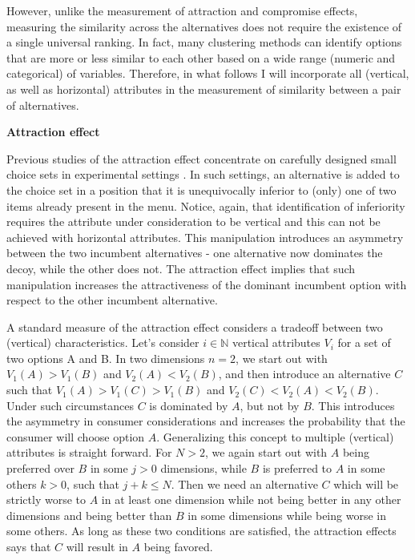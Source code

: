 \documentclass[a4paper,12pt]{article}
\begin{document}
However, unlike the measurement of attraction and compromise effects, measuring the similarity across the alternatives does not require the existence of a single universal ranking. In fact, many clustering methods can identify options that are more or less similar to each other based on a wide range (numeric and categorical) of variables. Therefore, in what follows I will incorporate all (vertical, as well as horizontal) attributes in the measurement of similarity between a pair of alternatives.

\textbf{Attraction effect}

Previous studies of the attraction effect concentrate on carefully designed small choice sets in experimental settings \citep{huberEtAl82, huberPuto83}. In such settings, an alternative is added to the choice set in a position that it is unequivocally inferior to (only) one of two items already present in the menu. Notice, again, that identification of inferiority requires the attribute under consideration to be vertical and this can not be achieved with horizontal attributes. This manipulation introduces an asymmetry between the two incumbent alternatives - one alternative now dominates the decoy, while the other does not. The attraction effect implies that such manipulation increases the attractiveness of the dominant incumbent option with respect to the other incumbent alternative. 

A standard measure of the attraction effect considers a tradeoff between two (vertical) characteristics. Let's consider $i \in \mathbb{N}$ vertical attributes  $V_i$ for a set of two options A and B. In two dimensions $n = 2$, we start out with $V_1(A) > V_1(B)$ and $V_2(A) < V_2(B)$, and then introduce an alternative $C$ such that $V_1(A) > V_1(C) > V_1(B)$ and $V_2(C) < V_2(A) < V_2(B)$. Under such circumstances $C$ is dominated by $A$, but not by $B$. This introduces the asymmetry in consumer considerations and increases the probability that the consumer will choose option $A$. Generalizing this concept to multiple (vertical) attributes is straight forward. For $N > 2$, we again start out with $A$ being preferred over $B$ in some $j > 0$ dimensions, while $B$ is preferred to $A$ in some others $k > 0$, such that $j+k \le N$. Then we need an alternative $C$ which will be strictly worse to $A$ in at least one dimension while not being better in any other dimensions and being better than $B$ in some dimensions while being worse in some others. As long as these two conditions are satisfied, the attraction effects says that $C$ will result in $A$ being favored. 
\end{document}
